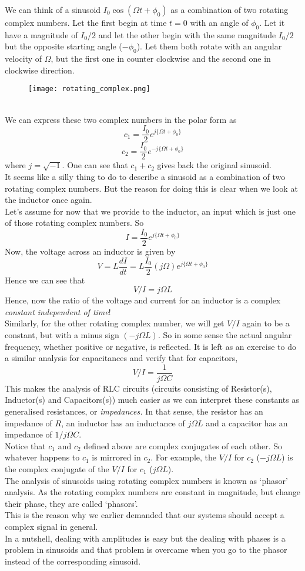 We can think of a sinusoid $I_0 \cos (\Omega t + \phi_0)$ as a combination of
two rotating complex numbers. Let the first begin at time $t = 0$ with an
angle of $\phi_0$. Let it have a magnitude of $I_0 / 2$ and let the other
begin with the same magnitude $I_0 / 2$ but the opposite starting angle ($-
\phi_0$). Let them both rotate with an angular velocity of $\Omega$, but the
first one in counter clockwise and the second one in clockwise direction.
\begin{figure}[ht]
\centering
\texttt{[image: rotating\_complex.png]}
\end{figure}
\\
We can express these two complex numbers in the polar form as
\[ c_1 = \frac{I_0}{2} e^{j \{ \Omega t + \phi_0 \}} \]
\[ c_2 = \frac{I_0}{2} e^{- j \{ \Omega t + \phi_0 \}} \]
where $j = \sqrt{- 1}$. One can see that $c_1 + c_2$ gives back the original
sinusoid.\\
It seems like a silly thing to do to describe a sinusoid as a combination of
two rotating complex numbers. But the reason for doing this is clear when we
look at the inductor once again.\\
Let's assume for now that we provide to the inductor, an input which is just
one of those rotating complex numbers. So
\[ I = \frac{I_0}{2} e^{j \{ \Omega t + \phi_0 \}} \]
Now, the voltage across an inductor is given by
\[ V = L \frac{d I}{d t} = L\frac{I_0}{2} (j \Omega) e^{j \{ \Omega t +
   \phi_0 \}} \]
Hence we can see that
\[ V / I = j \Omega L \]
Hence, now the ratio of the voltage and current for an inductor is a complex
\textit{constant independent of time}!\\
Similarly, for the other rotating complex number, we will get $V / I$ again to
be a constant, but with a minus sign $(- j \Omega L)$. So in some sense the
actual angular frequency, whether positive or negative, is reflected. It is left as an exercise to do a similar analysis for capacitances and verify that
for capacitors,
\[ V / I = \frac{1}{j \Omega C} \]
This makes the analysis of RLC circuits (circuits consisting of Resistor(s),
Inductor(s) and Capacitors(s)) much easier as we can interpret these constants
as generalised resistances, or \textit{impedances.} In that sense, the
resistor has an impedance of $R$, an inductor has an inductance of $j \Omega
L$ and a capacitor has an impedance of $1 / j \Omega C$.\\
Notice that $c_1$ and $c_2$ defined above are complex conjugates of each
other. So whatever happens to $c_1$ is mirrored in $c_2$. For example, the $V
/ I$ for $c_2$ ($- j \Omega L$) is the complex conjugate of the $V / I$ for
$c_1$ ($j \Omega L$).\\
The analysis of sinusoids using rotating complex numbers is known as `phasor'
analysis. As the rotating complex numbers are constant in magnitude, but
change their phase, they are called `phasors'.\\
This is the reason why we earlier demanded that our systems should accept a
complex signal in general.\\
In a nutshell, dealing with amplitudes is easy but the dealing with phases is
a problem in sinusoids and that problem is overcame when you go to the phasor
instead of the corresponding sinusoid.
